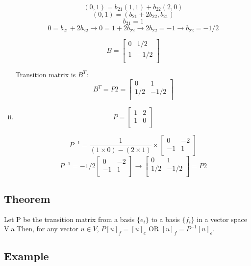 \documentclass{book}
\begin{document}
\begin{enumerate}[i.]
		\[(0, 1) = b_{21}(1, 1) + b_{22}(2, 0)\]
		\[(0, 1) = (b_{21} + 2b_{22}, b_{21})\]
		\[b_{21} = 1\]
		\[0 = b_{21} + 2b_{22} \rightarrow 0 = 1 + 2b_{22} \rightarrow 2b_{22} = -1 \rightarrow b_{22} = -1/2\]
		
		\[B = \begin{bmatrix}
			0 & 1/2 \\
			1 & -1/2 \\
		\end{bmatrix}\]

		Transition matrix is \(B^T\):
		\[B^T = P2 = \begin{bmatrix}
			0 & 1 \\
			1/2 & -1/2 \\
		\end{bmatrix}\]

	\item \[P = \begin{bmatrix}
			1 & 2 \\
			1 & 0 \\
		\end{bmatrix}\]

		\[P^{-1} = \frac{1}{(1 \times 0) - (2 \times 1)} \times \begin{bmatrix}
			0 & -2 \\
			-1 & 1 \\
		\end{bmatrix}\]
		\[P^{-1} = -1/2 \begin{bmatrix}
			0 & -2 \\
			-1 & 1 \\
		\end{bmatrix}
		\rightarrow
		\begin{bmatrix}
			0 & 1 \\
			1/2 & -1/2 \\
		\end{bmatrix} = P2\]
\end{enumerate}

\subsection{Theorem}

Let P be the transition matrix from a basis \(\{e_i\}\) to a basis \(\{f_i\}\) in a vector space V.a Then, for any vector \(u \in V\), \(P{[u]}_f = {[u]}_e\) OR \({[u]}_f = P^{-1}{[u]}_e\).

\subsection{Example}
\end{document}
